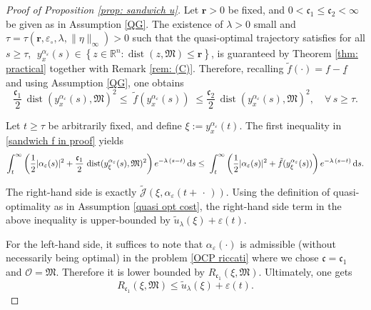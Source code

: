 \documentclass[10pt,a4paper]{amsart}
\newcommand{\D}[1]{\mbox{\rm #1}}
\newcommand{\dd}{\D{d}}
\begin{document}
\begin{proof}[Proof of Proposition \ref{prop: sandwich u}]
Let $\mathbf{r}>0$ be fixed, and $0<\mathfrak{c}_{1}\leq \mathfrak{c}_{2}<\infty$ be given as in Assumption \ref{QG}. 
The existence of $\lambda>0$ small and $\tau = \tau(\mathbf{r},\varepsilon_{\circ},\lambda, \|\eta\|_{\infty})>0$  such that the quasi-optimal trajectory satisfies for all $s\geq \tau$,  $\;y_{x}^{\alpha_{\varepsilon}}(s) \in \left\{z\in \mathbb{R}^{n}: \operatorname{dist}(z,\mathfrak{M})\leq \mathbf{r}\right\}$, is guaranteed by Theorem \ref{thm: practical} together with Remark \ref{rem: (C)}. Therefore, recalling $\tilde{f}(\cdot)=f-\underline{f}$ and using Assumption \ref{QG}, one obtains
\begin{equation}\label{sandwich f in proof}
    \frac{\mathfrak{c}_{1}}{2} \, \operatorname{dist}(y_{x}^{\alpha_{\varepsilon}}(s),\mathfrak M)^2 \le \; \tilde{f}(y_{x}^{\alpha_{\varepsilon}}(s))  \; \le  \frac{\mathfrak{c}_{2}}{2} \, \operatorname{dist}(y_{x}^{\alpha_{\varepsilon}}(s),\mathfrak M)^2, \quad\forall\,s\geq \tau.
\end{equation}

Let $t\geq \tau$ be arbitrarily fixed, and define $\xi:= y_{x}^{\alpha_{\varepsilon}}(t)$.  The  first inequality in \eqref{sandwich f in proof} yields 
\begin{equation*}
    \int_{t}^{\infty}\left(\frac{1}{2}|\alpha_{\varepsilon}(s)|^{2} + \frac{\mathfrak{c}_{1}}{2} \, \operatorname{dist}(y_{\xi}^{\alpha_{\varepsilon}}(s),\mathfrak M)^2 \right)e^{-\lambda\,(s-t)}\,\dd s
    \leq \; \int_{t}^{\infty}\left(\frac{1}{2}|\alpha_{\varepsilon}(s)|^{2} + \tilde{f}(y_{\xi}^{\alpha_{\varepsilon}}(s))\right)e^{-\lambda\,(s-t)}\,\dd s.
\end{equation*}

The right-hand side is exactly $\widetilde{\mathscr{J}}(\xi,\alpha_{\varepsilon}(t+\,\cdot\,))$. Using the definition of quasi-optimality as in Assumption \ref{quasi opt cost}, the right-hand side term in the above inequality is upper-bounded by $\tilde{u}_{\lambda}(\xi) + \varepsilon(t)$. 

For the left-hand side, it suffices to note that $\alpha_{\varepsilon}(\cdot)$ is admissible (without necessarily being optimal) in the problem \eqref{OCP riccati} where we chose $\mathfrak{c}=\mathfrak{c}_{1}$ and $\mathscr{O}=\mathfrak{M}$. Therefore it is lower bounded by $R_{\mathfrak{c}_{1}}(\xi, \mathfrak{M})$. Ultimately, one gets
\begin{equation}\label{eq: low R}
    R_{\mathfrak{c}_{1}}(\xi, \mathfrak{M}) \leq \tilde{u}_{\lambda}(\xi) + \varepsilon(t).
\end{equation}


\end{proof}
\end{document}
